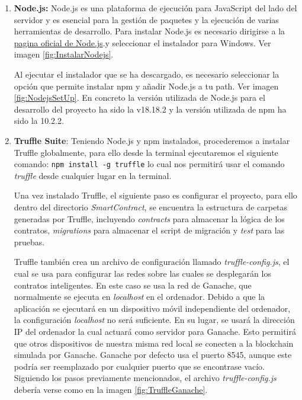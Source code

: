 \begin{enumerate}

\item \textbf{Node.js:} Node.js es una plataforma de ejecución para JavaScript del lado del servidor y es esencial para la gestión de paquetes y la ejecución de varias herramientas de desarrollo. 
Para instalar Node.js es necesario dirigirse a la \href{https://nodejs.org/en}{pagina oficial de Node.js}.y seleccionar el instalador para Windows. Ver imagen \ref{fig:InstalarNodejs}.

Al ejecutar el instalador que se ha descargado, es necesario seleccionar la opción que permite instalar npm y añadir Node.js a tu path. Ver imagen \ref{fig:NodejsSetUp}.  
En concreto la versión utilizada de Node.js para el desarrollo del proyecto ha sido la v18.18.2 y la versión utilizada de npm ha sido la 10.2.2.


\item \textbf{Truffle Suite}: Teniendo Node.js y npm instalados, procederemos a instalar Truffle globalmente, para ello desde la terminal ejecutaremos el siguiente comando: \texttt{npm install -g truffle} lo cual nos permitirá usar el comando \textit{truffle} desde cualquier lugar en la terminal.

Una vez instalado Truffle, el siguiente paso es configurar el proyecto, para ello dentro del directorio \textit{SmartContract}, se encuentra la estructura de carpetas generadas por Truffle, incluyendo \textit{contracts} para almacenar la lógica de los contratos, \textit{migrations} para almacenar el script de migración y \textit{test} para las pruebas.

Truffle también crea un archivo de configuración llamado \textit{truffle-config.js}, el cual se usa para configurar las redes sobre las cuales se desplegarán los contratos inteligentes.
En este caso se usa la red de Ganache, que normalmente se ejecuta en \textit{localhost} en el ordenador. Debido a que la aplicación se ejecutará en un dispositivo móvil independiente del ordenador, la configuración \textit{localhost} no será suficiente. 
En su lugar, se usará la dirección IP del ordenador la cual actuará como servidor para Ganache. Esto permitirá que otros dispositivos de nuestra misma red local se conecten a la blockchain simulada por Ganache.
Ganache por defecto usa el puerto 8545, aunque este podría ser reemplazado por cualquier puerto que se encontrase vacío.
Siguiendo los pasos previamente mencionados, el archivo \textit{truffle-config.js} debería verse como en la imagen \ref{fig:TruffleGanache}.


\end{enumerate}
